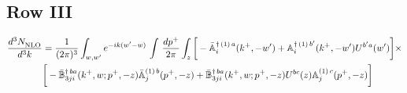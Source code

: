 \documentclass[9pt]{article}
\def\mf#1{\mathbb{#1}}
\numberwithin{equation}{section}
\begin{document}
\subsection{Row III\,}
\begin{align}
\frac{d^{3}N_{\rm NLO}^{\rm}}{d^{3}k}  & = \frac{1}{(2\pi)^{3}}  \int_{w, w^\prime} e^{-ik(w^\prime-w)}\, \int\,\frac{dp^{+}}{2\pi} \int_{z} \bigg[-\bar{\mf{A}}^{\dagger\,(1)\,a}_{i}(k^{+},-w^{\prime})+\mf{A}^{\dagger\, (1)\, b^{\prime}}_{i}(k^{+},-w^{\prime})U^{b^{\prime}a}(w^{\prime})\bigg]\times \notag \\ &  \bigg[-\Bar{\mf{B}}^{\dagger\, ba}_{3ji}(k^{+}, w; p^{+}, -z)\Bar{\mf{A}}^{(1)\,b}_{j}(p^{+}, - z)+ \Bar{\mf{B}}^{\dagger\, ba}_{3ji}(k^{+},w; p^{+},-z) U^{bc}(z) \mf{A}^{(1)\, c}_{j}(p^{+},- z)\bigg]\nonumber
\end{align}
\end{document}

